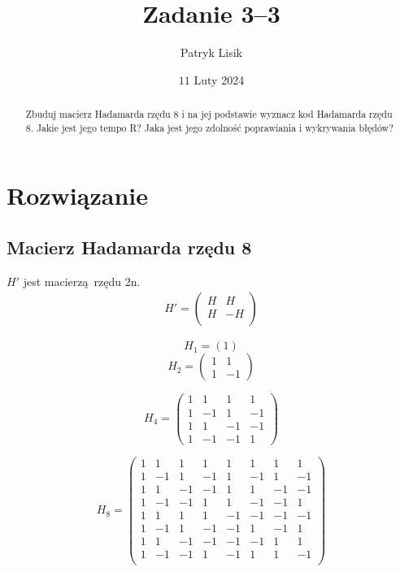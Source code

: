 \documentclass[12pt]{article}
\title{Zadanie 3--3}
\author{Patryk Lisik}
\date{\(11\) Luty  2024}
\begin{document}
\maketitle
\renewcommand{\abstractname}{Treść}

\begin{abstract}
    Zbuduj macierz Hadamarda rzędu 8 i na jej podstawie wyznacz kod Hadamarda rzędu 8. Jakie jest jego tempo R? 
    Jaka jest jego zdolność poprawiania i wykrywania błędów?
\end{abstract}


\section*{Rozwiązanie}
\subsection*{Macierz Hadamarda rzędu 8}
$H'$ jest macierzą rzędu 2n.
\begin{align*}
    H' = \begin{pmatrix}
        H & H \\
        H & -H \\
    \end{pmatrix}
\end{align*}

$$H_1 = (1) $$
$$H_2 = \begin{pmatrix}
    1 & 1 \\   
    1 & -1
\end{pmatrix}
$$

$$ 
H_4 = \begin{pmatrix}
    1 & 1  &  1  &  1 \\ 
    1 & -1 &  1  & -1 \\
    1 & 1  & -1  & -1 \\
    1 & -1 & -1  &  1 
\end{pmatrix}
$$

$$
H_8 = \begin{pmatrix}
    1 &  1 &  1  &  1 & 1  & 1  &  1   &  1 \\ 
    1 & -1 &  1  & -1 & 1  & -1 &  1   & -1 \\
    1 &  1 & -1  & -1 & 1  & 1  & -1   & -1 \\
    1 & -1 & -1  &  1 & 1  & -1 & -1   &  1 \\
    1 & 1  &  1  &  1 & -1 & -1 & -1  & -1 \\
    1 & -1 &  1  & -1 & -1 &  1 & -1  &  1 \\
    1 & 1  & -1  & -1 & -1 & -1 &  1  &  1 \\
    1 & -1 & -1  &  1 & -1 &  1 &  1  & -1 \\ 
\end{pmatrix}
$$
\end{document}
